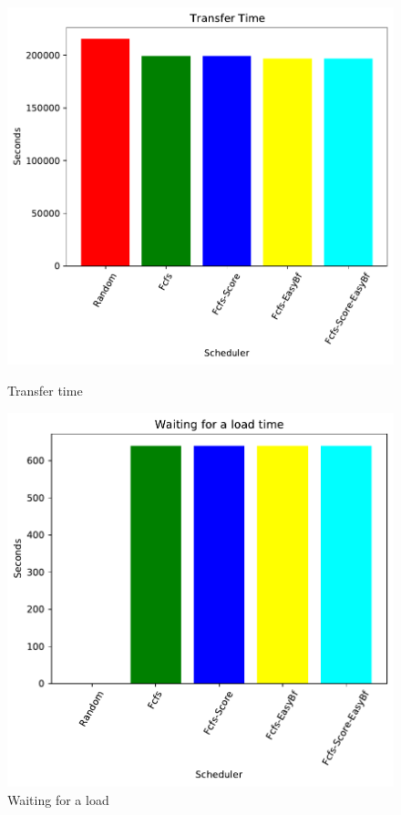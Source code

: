 \documentclass[a4paper]{article}
\begin{document}
	\begin{figure}[H] 
	\begin{minipage}[b]{0.5\linewidth}\centering\includegraphics[width=1.11\linewidth]{MBSS/plot/2021-05-23-800_Transfer_time.pdf}\caption{Transfer time}\vspace{4ex}\end{minipage}
	\begin{minipage}[b]{0.5\linewidth}\centering\includegraphics[width=1.11\linewidth]{MBSS/plot/2021-05-23-800_Waiting_for_a_load_time.pdf}\caption{Waiting for a load}\vspace{4ex}\end{minipage} 

\end{figure}
\end{document}
